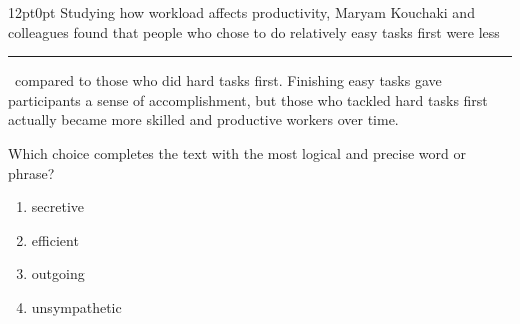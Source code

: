 \documentclass[11pt, twocolumn]{article}
\newcounter{questionnum}
\begin{document}
\vspace{6pt}\noindent
\begin{minipage}{\columnwidth}\raggedright
\noindent{}\par\vspace{8pt}
\begin{adjustwidth}{12pt}{0pt}
Studying how workload affects productivity, Maryam Kouchaki and colleagues found that people who chose to do relatively easy tasks first were less \,\rule{2cm}{0.4pt}\, compared to those who did hard tasks first. Finishing easy tasks gave participants a sense of accomplishment, but those who tackled hard tasks first actually became more skilled and productive workers over time.
\vspace{6pt}

Which choice completes the text with the most logical and precise word or phrase?
\begin{enumerate}[label=\Alph*),leftmargin=18pt,topsep=3pt,itemsep=2pt]
  \item secretive
  \item efficient
  \item outgoing
  \item unsympathetic
\end{enumerate}
\end{adjustwidth}
\end{minipage}\par
\end{document}
